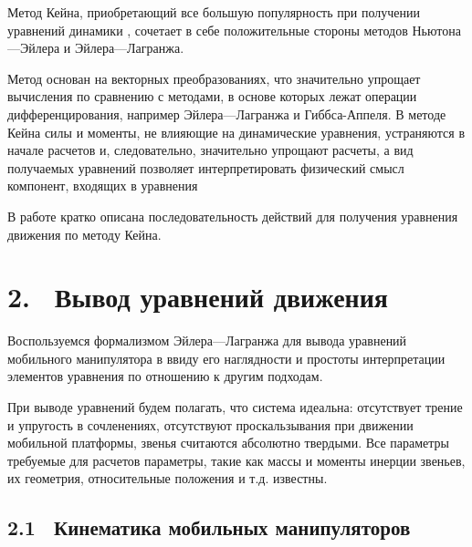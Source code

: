 \documentclass[14pt, a4paper]{extreport}
\begin{document}
Метод Кейна, приобретающий все большую популярность при получении уравнений динамики \cite{Hussain, Tanner, Ariff}, сочетает в себе положительные стороны методов Ньютона---Эйлера и Эйлера---Лагранжа. 

Метод основан на векторных преобразованиях, что значительно упрощает вычисления по сравнению с методами, в основе которых лежат операции дифференцирования, например Эйлера---Лаг­ранжа и Гиббса-Аппеля. В методе Кейна силы и моменты, не влияющие на динамические уравнения, устраняются в начале расчетов и, следовательно, значительно упрощают расчеты, а вид получаемых уравнений позволяет интерпретировать физический смысл компонент, входящих в уравнения

В работе \cite{Hussain} кратко описана последовательность действий для получения уравнения движения по методу Кейна.
\newpage
\ \\

\section*{2. \ Вывод уравнений движения}

Воспользуемся формализмом Эйлера---Лаг­ранжа для вывода уравнений мобильного манипулятора в ввиду его наглядности и простоты интерпретации элементов уравнения по отношению к другим подходам.

При выводе уравнений будем полагать, что система идеальна: отсутствует трение и упругость в сочленениях, отсутствуют проскальзывания при движении мобильной платформы, звенья считаются абсолютно твердыми. Все параметры требуемые для расчетов параметры, такие как массы и моменты инерции звеньев, их геометрия, относительные положения и т.д. известны.

\subsection*{2.1 \ Кинематика мобильных манипуляторов}
\end{document}

